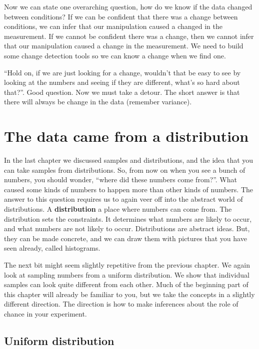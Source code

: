 \documentclass[
]{book}
\begin{document}
Now we can state one overarching question, how do we know if the data changed between conditions? If we can be confident that there was a change between conditions, we can infer that our manipulation caused a changed in the measurement. If we cannot be confident there was a change, then we cannot infer that our manipulation caused a change in the measurement. We need to build some change detection tools so we can know a change when we find one.

``Hold on, if we are just looking for a change, wouldn't that be easy to see by looking at the numbers and seeing if they are different, what's so hard about that?''. Good question. Now we must take a detour. The short answer is that there will always be change in the data (remember variance).

\section{The data came from a distribution}\label{the-data-came-from-a-distribution}

In the last chapter we discussed samples and distributions, and the idea that you can take samples from distributions. So, from now on when you see a bunch of numbers, you should wonder, ``where did these numbers come from?''. What caused some kinds of numbers to happen more than other kinds of numbers. The answer to this question requires us to again veer off into the abstract world of distributions. A \textbf{distribution} a place where numbers can come from. The distribution sets the constraints. It determines what numbers are likely to occur, and what numbers are not likely to occur. Distributions are abstract ideas. But, they can be made concrete, and we can draw them with pictures that you have seen already, called histograms.

The next bit might seem slightly repetitive from the previous chapter. We again look at sampling numbers from a uniform distribution. We show that individual samples can look quite different from each other. Much of the beginning part of this chapter will already be familiar to you, but we take the concepts in a slightly different direction. The direction is how to make inferences about the role of chance in your experiment.

\subsection{Uniform distribution}\label{uniform-distribution}
\end{document}
